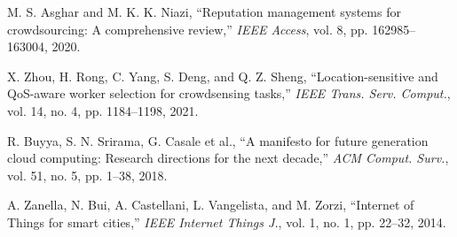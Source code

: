 \documentclass[10pt,twocolumn,a4paper]{article}
\begin{document}
\noindent
[22] M. S. Asghar and M. K. K. Niazi, ``Reputation management systems for crowdsourcing: A comprehensive review,'' \textit{IEEE Access}, vol. 8, pp. 162985--163004, 2020.

\noindent
[23] X. Zhou, H. Rong, C. Yang, S. Deng, and Q. Z. Sheng, ``Location-sensitive and QoS-aware worker selection for crowdsensing tasks,'' \textit{IEEE Trans. Serv. Comput.}, vol. 14, no. 4, pp. 1184--1198, 2021.

\noindent
[24] R. Buyya, S. N. Srirama, G. Casale et al., ``A manifesto for future generation cloud computing: Research directions for the next decade,'' \textit{ACM Comput. Surv.}, vol. 51, no. 5, pp. 1--38, 2018.

\noindent
[25] A. Zanella, N. Bui, A. Castellani, L. Vangelista, and M. Zorzi, ``Internet of Things for smart cities,'' \textit{IEEE Internet Things J.}, vol. 1, no. 1, pp. 22--32, 2014.
\end{document}
